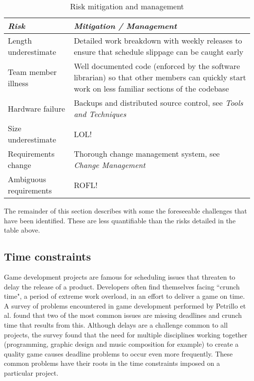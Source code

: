 \begin{table*}
	\small
	\begin{tabular}{l p{37em}}
		\toprule
		\emph{Risk} & \emph{Mitigation / Management} \\
		\midrule
		Length underestimate & Detailed work breakdown with weekly releases to ensure that
			schedule slippage can be caught early \\
		Team member illness & Well documented code (enforced by the software librarian) so
			that other members can quickly start work on less familiar sections of
			the codebase \\
		Hardware failure & Backups and distributed source control, see \emph{Tools and Techniques} \\
		Size underestimate & LOL! \\
		Requirements change & Thorough change management system, see \emph{Change Management} \\
		Ambiguous requirements & ROFL! \\
		\bottomrule
	\end{tabular}
	\vspace{1.5em}
	\caption{Risk mitigation and management}
	\label{tab:rmm}
\end{table*}

The remainder of this section describes with some the foreseeable challenges that have been
identified. These are less quantifiable than the risks detailed in the table above.

\subsection{Time constraints}

Game development projects are famous for scheduling issues that threaten to delay the
release of a product. Developers often find themselves facing ``crunch time", a period
of extreme work overload, in an effort to deliver a game on time.\cite[-1em]{groen2011}
A survey of problems encountered in game development performed by Petrillo et al. found
that two of the most common issues are missing deadlines and crunch time that results 
from this.\cite[1em]{petrillo2009} Although delays are a challenge common to all projects,
the survey found that the need for multiple disciplines working together (programming,
graphic design and music composition for example) to create a quality game causes
deadline problems to occur even more frequently. These common problems have their roots
in the time constraints imposed on a particular project.

